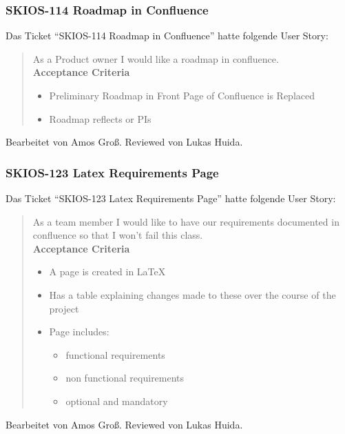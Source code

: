 \subsubsection{SKIOS-114 Roadmap in Confluence}
Das Ticket \enquote{SKIOS-114 Roadmap in Confluence} hatte folgende User Story:
\begin{quotation}
    As a Product owner I would like a roadmap in confluence. \\
\textbf{Acceptance Criteria}
\begin{itemize}
    \item Preliminary Roadmap in Front Page of Confluence is Replaced
    \item Roadmap reflects or PIs
\end{itemize}
\end{quotation}
Bearbeitet von Amos Groß.
Reviewed von Lukas Huida.

\subsubsection{SKIOS-123 Latex Requirements Page}
Das Ticket \enquote{SKIOS-123 Latex Requirements Page} hatte folgende User Story:
\begin{quotation}
    As a team member I would like to have our requirements documented in confluence so that I won't fail this class. \\
\textbf{Acceptance Criteria}
\begin{itemize}
    \item A page is created in LaTeX
    \item Has a table explaining changes made to these over the course of the project
    \item Page includes:
    \begin{itemize}
    \item functional requirements
    \item non functional requirements 
    \item optional and mandatory
    \end{itemize}
\end{itemize}
\end{quotation}
Bearbeitet von Amos Groß.
Reviewed von Lukas Huida.

